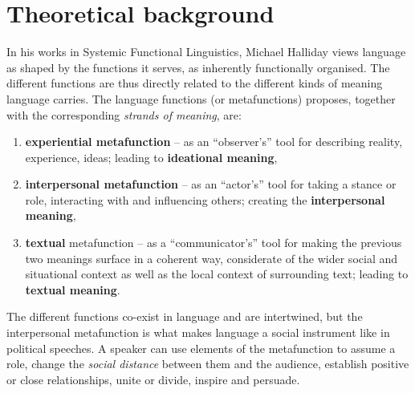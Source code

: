 \documentclass[11pt]{article}
\begin{document}
\section*{Theoretical background}{
	In his works in Systemic Functional Linguistics, Michael Halliday views language as shaped by the functions it serves, as inherently functionally organised. The different functions are thus directly related to the different kinds of meaning language carries.
	The language functions (or metafunctions) \citet{Halliday1970IM} proposes, together with the corresponding \textit{strands of meaning}, are:
	\begin{enumerate}
		\item \textbf{experiential metafunction} -- as an ``observer's'' tool for describing reality, experience, ideas; leading to \textbf{ideational meaning},
		\item \textbf{interpersonal metafunction} -- as an ``actor's'' tool for taking a stance or role, interacting with and influencing others; creating the \textbf{interpersonal meaning},
		\item \textbf{textual} metafunction -- as a ``communicator's'' tool for making the previous two meanings surface in a coherent way, considerate of the wider social and situational context as well as the local context of surrounding text; leading to \textbf{textual meaning}.
	\end{enumerate}
	The different functions co-exist in language and are intertwined, but the interpersonal metafunction is what makes language a social instrument like in political speeches. A speaker can use elements of the metafunction to assume a role, change the \textit{social distance} between them and the audience, establish positive or close relationships, unite or divide, inspire and persuade.
}
\end{document}
